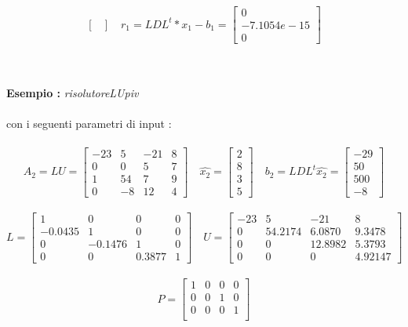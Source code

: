 \begin{description}
\[\begin{bmatrix}
	\end{bmatrix} \quad
	r_1 = LDL^t*x_1-b_1 =\begin{bmatrix}
		  0 \\
		  -7.1054e-15 \\
		  0
	\end{bmatrix}
	\]\\\\
\item \textbf{Esempio :} \textit{risolutoreLUpiv}\\\\	
	con i seguenti parametri di input :\\\	  
	\[
	A_2 = LU =\begin{bmatrix}
		-23 & 5 & -21 & 8 \\ 
		0 & 0 & 5 & 7 \\
		1 & 54 & 7 & 9 \\
		0 & -8 & 12 & 4  
	\end{bmatrix} \quad
	\hat{x_2} =\begin{bmatrix}
		2 \\
		8 \\
		3 \\
		5               
	\end{bmatrix} \quad
	b_2 = LDL^t \hat{x_2} =\begin{bmatrix}
		-29 \\
		50 \\
		500 \\
		-8                
	\end{bmatrix}
	\]\\
	\[
	L =\begin{bmatrix}
		   1   &  0  & 0 & 0 \\ 
		-0.0435 &  1  & 0 & 0 \\
		   0   &  -0.1476  & 1 & 0 \\
		   0   &  0  & 0.3877 & 1 		    
	\end{bmatrix} \quad
	U =\begin{bmatrix}
		-23 & 5 & -21 & 8   \\ 
		0 & 54.2174 & 6.0870 & 9.3478   \\ 
		0 & 0 & 12.8982 & 5.3793  \\ 
		0 & 0 & 0 & 4.92147		
	\end{bmatrix}
	\]\\ 
	\[
	P =\begin{bmatrix}
		1 & 0 & 0 & 0 \\ 
		0 & 0 & 1 & 0 \\
		0 & 0 & 0 & 1 \\

\end{bmatrix}\]
\end{description}
